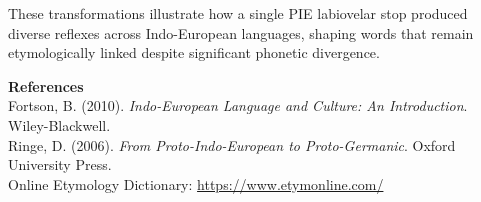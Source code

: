 \begin{technical}
\noindent
These transformations illustrate how a single PIE labiovelar stop produced diverse reflexes across Indo-European languages, shaping words that remain etymologically linked despite significant phonetic divergence.

\vspace{0.5em}
\noindent\textbf{References}\\
Fortson, B. (2010). \emph{Indo-European Language and Culture: An Introduction}. Wiley-Blackwell.\\
Ringe, D. (2006). \emph{From Proto-Indo-European to Proto-Germanic}. Oxford University Press.\\
Online Etymology Dictionary: \url{https://www.etymonline.com/}\\
\end{technical}

